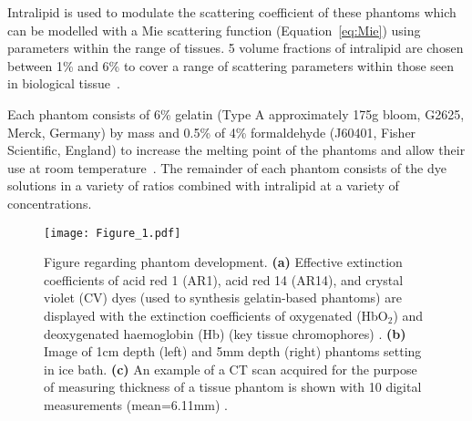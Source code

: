 Intralipid is used to modulate the scattering coefficient of these phantoms which can be modelled with a Mie scattering function (Equation~\eqref{eq:Mie}) using parameters within the range of tissues. 5 volume fractions of intralipid are chosen between 1\% and 6\% to cover a range of scattering parameters within those seen in biological tissue~\citep{Jacques2013}. 

Each phantom consists of 6\% gelatin (Type A approximately 175g bloom, G2625, Merck, Germany) by mass %
and 0.5\% of 4\% formaldehyde (J60401, Fisher Scientific, England) to increase the melting point of the phantoms and allow their use at room temperature~\citep{Pogue2006}. The remainder of each phantom consists of the dye solutions in a variety of ratios combined with intralipid at a variety of concentrations. 

\begin{figure}[htb]
    \centering%
    \texttt{[image: Figure\_1.pdf]}
    \caption{Figure regarding phantom development. 
    \textbf{(a)}
    Effective extinction coefficients of acid red 1 (AR1), acid red 14 (AR14), and crystal violet (CV) dyes 
    (used to synthesis gelatin-based phantoms)
    are displayed with the extinction coefficients of oxygenated (HbO$_2$) and deoxygenated haemoglobin (Hb) 
    (key tissue chromophores)
    .
    \textbf{(b)}
    Image of 1cm depth (left) and 5mm depth (right) phantoms setting in ice bath.
    \textbf{(c)}
    An example of a CT scan acquired for the purpose of measuring thickness of a tissue phantom is shown with
    10 digital measurements (mean=6.11mm)%
    .}
    \label{fig:phantommethods}%
\end{figure}

